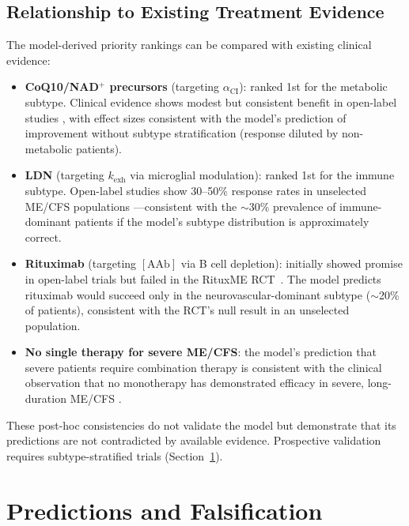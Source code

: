 \subsection{Relationship to Existing Treatment Evidence}

The model-derived priority rankings can be compared with existing clinical evidence:

\begin{itemize}
    \item \textbf{CoQ10/NAD$^+$ precursors} (targeting $\alpha_{\text{CI}}$): ranked 1st for the metabolic subtype. Clinical evidence shows modest but consistent benefit in open-label studies \cite{Rekeland2024}, with effect sizes consistent with the model's prediction of improvement without subtype stratification (response diluted by non-metabolic patients).
    \item \textbf{LDN} (targeting $k_{\text{exh}}$ via microglial modulation): ranked 1st for the immune subtype. Open-label studies show 30--50\% response rates in unselected ME/CFS populations \cite{Polo2019LDN,Bolton2020LDN}---consistent with the $\sim$30\% prevalence of immune-dominant patients if the model's subtype distribution is approximately correct.
    \item \textbf{Rituximab} (targeting $[\text{AAb}]$ via B cell depletion): initially showed promise in open-label trials but failed in the RituxME RCT~\cite{Fluge2019}. The model predicts rituximab would succeed only in the neurovascular-dominant subtype ($\sim$20\% of patients), consistent with the RCT's null result in an unselected population.
    \item \textbf{No single therapy for severe ME/CFS}: the model's prediction that severe patients require combination therapy is consistent with the clinical observation that no monotherapy has demonstrated efficacy in severe, long-duration ME/CFS \cite{Fluge2019}.
\end{itemize}

These post-hoc consistencies do not validate the model but demonstrate that its predictions are not contradicted by available evidence. Prospective validation requires subtype-stratified trials (Section~\ref{sec:formal-predictions}).

\section{Predictions and Falsification}
\label{sec:formal-predictions}


